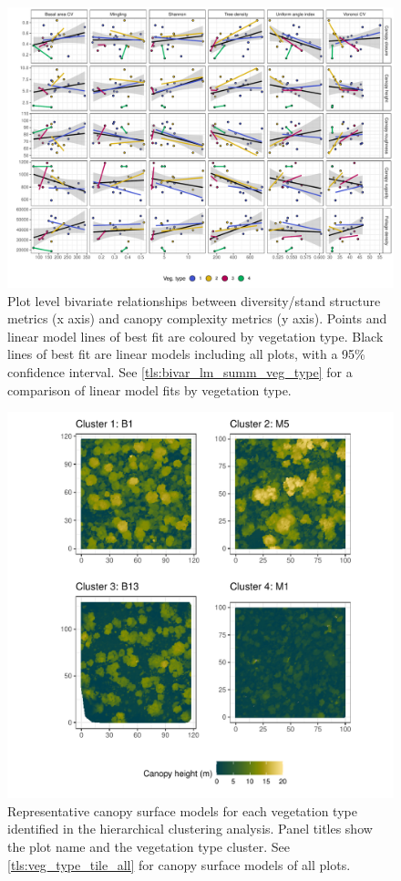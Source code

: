 \begin{refsection}
\begin{landscape}
\begin{figure}
	\includegraphics[width=0.8\linewidth]{img/bivar_plot}
	\caption[Bivariate plots comparing diversity, stand structure and canopy complexity]{Plot level bivariate relationships between diversity/stand structure metrics (x axis) and canopy complexity metrics (y axis). Points and linear model lines of best fit are coloured by vegetation type. Black lines of best fit are linear models including all plots, with a 95\% confidence interval. See \autoref{tls:bivar_lm_summ_veg_type} for a comparison of linear model fits by vegetation type.}
	\label{tls:plot_bivar}
\end{figure}
\end{landscape}


\begin{figure}
	\includegraphics[width=\linewidth]{img/veg_type_tile}
	\caption[Canopy surface models]{Representative canopy surface models for each vegetation type identified in the hierarchical clustering analysis. Panel titles show the plot name and the vegetation type cluster. See \autoref{tls:veg_type_tile_all} for canopy surface models of all plots.}
	\label{tls:veg_type_tile}
\end{figure}


\end{refsection}
